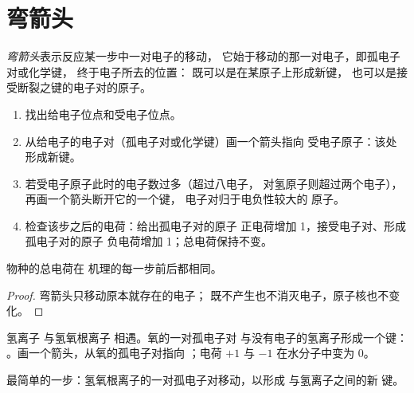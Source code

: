\section{弯箭头}

\begin{definition}[弯箭头]\label{def:g12:curly-arrows:curly-arrow}
\emph{弯箭头}表示反应某一步中一对电子的移动，
它始于移动的那一对电子，即孤电子对或化学键，
终于电子所去的位置：
既可以是在某原子上形成新键，
也可以是接受断裂之键的电子对的原子。
\end{definition}

\begin{method}[画弯箭头]\label{met:g12:curly-arrows:drawing}
\begin{enumerate}
  \item 找出给电子位点和受电子位点。
  \item 从给电子的电子对（孤电子对或化学键）画一个箭头指向
        受电子原子：该处形成新键。
  \item 若受电子原子此时的电子数过多（超过八电子，
        对氢原子则超过两个电子），再画一个箭头断开它的一个键，
        电子对归于电负性较大的
        原子。
  \item 检查该步之后的电荷：给出孤电子对的原子
        正电荷增加 1，接受电子对、形成孤电子对的原子
        负电荷增加 1；总电荷保持不变。
\end{enumerate}
\end{method}

\begin{proposition}[每一步中电荷守恒]\label{prop:g12:curly-arrows:charge}
物种的总电荷在
机理的每一步前后都相同。
\end{proposition}

\begin{proof}
弯箭头只移动原本就存在的电子；
既不产生也不消灭电子，原子核也不变化。
\end{proof}

\begin{example}[第一个箭头]\label{ex:g12:curly-arrows:first}
氢离子  与氢氧根离子  相遇。氧的一对孤电子对
与没有电子的氢离子形成一个键：
。画一个箭头，从氧的孤电子对指向
；电荷 $+1$ 与 $-1$ 在水分子中变为 0。
\end{example}

\begin{omfigure}
\qquad\raisebox{0.2ex}{$+$}\qquad
{}
\qquad\raisebox{0.2ex}{$\longrightarrow$}\qquad
{}

{\small 最简单的一步：氢氧根离子的一对孤电子对移动，以形成
与氢离子之间的新  键。}
\end{omfigure}

